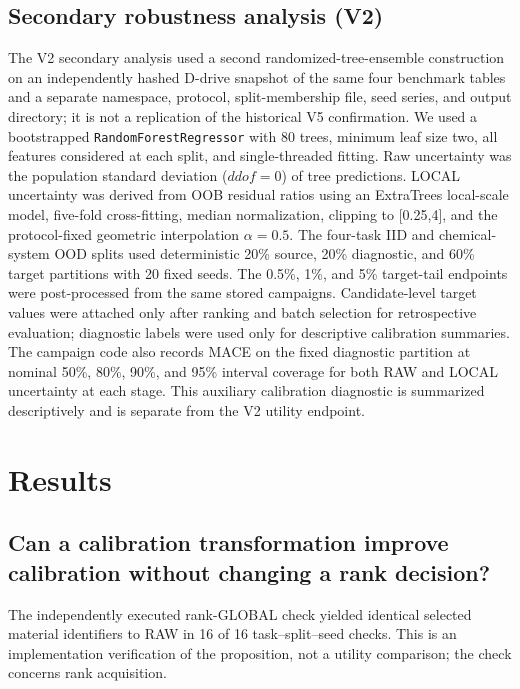 \documentclass[11pt]{article}
\newcommand{\code}[1]{\texttt{#1}}
\begin{document}
\subsection{Secondary robustness analysis (V2)}
The V2 secondary analysis used a second randomized-tree-ensemble construction on an independently hashed D-drive snapshot of the same four benchmark tables and a separate namespace, protocol, split-membership file, seed series, and output directory; it is not a replication of the historical V5 confirmation. We used a bootstrapped \code{RandomForestRegressor} with 80 trees, minimum leaf size two, all features considered at each split, and single-threaded fitting. Raw uncertainty was the population standard deviation (\(ddof=0\)) of tree predictions. LOCAL uncertainty was derived from OOB residual ratios using an ExtraTrees local-scale model, five-fold cross-fitting, median normalization, clipping to [0.25,4], and the protocol-fixed geometric interpolation \(\alpha=0.5\). The four-task IID and chemical-system OOD splits used deterministic 20\% source, 20\% diagnostic, and 60\% target partitions with 20 fixed seeds. The 0.5\%, 1\%, and 5\% target-tail endpoints were post-processed from the same stored campaigns. Candidate-level target values were attached only after ranking and batch selection for retrospective evaluation; diagnostic labels were used only for descriptive calibration summaries. The campaign code also records MACE on the fixed diagnostic partition at nominal 50\%, 80\%, 90\%, and 95\% interval coverage for both RAW and LOCAL uncertainty at each stage. This auxiliary calibration diagnostic is summarized descriptively and is separate from the V2 utility endpoint.

\section{Results}
\subsection{Can a calibration transformation improve calibration without changing a rank decision?}
The independently executed rank-GLOBAL check yielded identical selected material identifiers to RAW in 16 of 16 task--split--seed checks. This is an implementation verification of the proposition, not a utility comparison; the check concerns rank acquisition.
\end{document}
